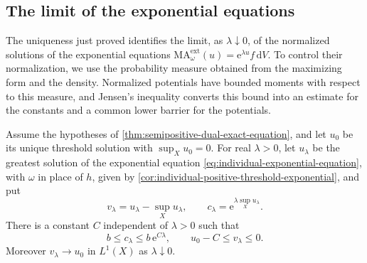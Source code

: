 \subsection{The limit of the exponential equations}
\label{subsec:semipositive-exponential-setting}

The uniqueness just proved identifies the limit, as $\lambda\downarrow0$, of the normalized solutions of the exponential equations $\mathrm{MA}^{\mathrm{ext}}_\omega(u)=\mathrm{e}^{\lambda u}f\,\mathrm{d}V$. To control their normalization, we use the probability measure obtained from the maximizing form and the density. Normalized potentials have bounded moments with respect to this measure, and Jensen's inequality converts this bound into an estimate for the constants and a common lower barrier for the potentials.

\begin{proposition}\label{prop:semipositive-dual-exponential-limit}
Assume the hypotheses of \cref{thm:semipositive-dual-exact-equation}, and let $u_0$ be its unique threshold solution with $\sup_Xu_0=0$. For real $\lambda>0$, let $u_\lambda$ be the greatest solution of the exponential equation \eqref{eq:individual-exponential-equation}, with $\omega$ in place of $h$, given by \cref{cor:individual-positive-threshold-exponential}, and put
\[
 v_\lambda=u_\lambda-\sup_Xu_\lambda,\qquad
 c_\lambda=\mathrm{e}^{\lambda\sup_Xu_\lambda}.
\]
There is a constant $C$ independent of $\lambda>0$ such that
\[
 b\leq c_\lambda\leq b\,\mathrm{e}^{C\lambda},\qquad
 u_0-C\leq v_\lambda\leq0.
\]
Moreover $v_\lambda\to u_0$ in $L^1(X)$ as $\lambda\downarrow0$.
\end{proposition}
